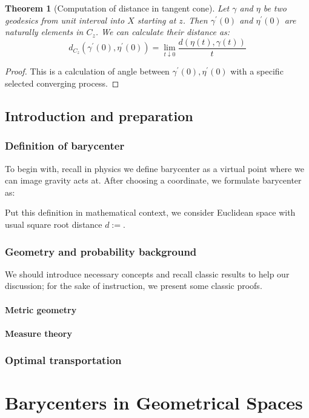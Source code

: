 \documentclass{report}
\newtheorem{thm}{Theorem}
\theoremstyle{remark}
\theoremstyle{definition}
\begin{document}
\begin{thm}[Computation of distance in tangent cone]
	Let $\gamma$ and  $\eta$ be two geodesics from unit interval into $X$ starting at $z$.  Then $\gamma^\prime(0)$ and $\eta^\prime(0)$ are naturally elements in $C_z$.  We can calculate their distance as:
	\[  d_{C_z}(\gamma^\prime(0),\eta^\prime(0))=\lim _ { t \downarrow 0 } \frac  {d ( \eta ( t ) , \gamma ( t ) )  }{ t }\]
\end{thm}

\begin{proof}
	This is a calculation of angle between $\gamma^\prime(0),\eta^\prime(0)$ with a specific selected converging process.
\end{proof}
\chapter{Introduction and preparation}
\section{Definition of barycenter}
To begin with, recall in physics we define barycenter as a virtual point where we can image gravity acts at. After choosing a coordinate, we formulate barycenter as:

Put this definition in mathematical context, we consider Euclidean space with usual square root distance $d:=$.

\section{Geometry and probability background}
We should introduce necessary concepts and recall classic results to help our discussion; for the sake of instruction, we present some classic proofs.
\subsection{Metric geometry}
\subsection{Measure theory}

\section{Optimal transportation}

\part{Barycenters in Geometrical Spaces}
\end{document}
